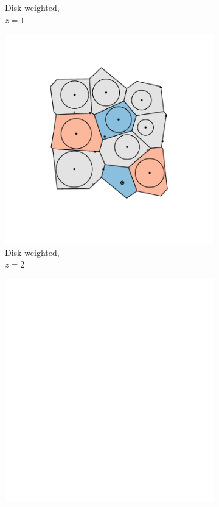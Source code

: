 \begin{figure}[tb]
\begin{subfigure}[b]{0.23\textwidth}
         \caption{Disk weighted, \\$z=1$}
         \label{fig:cut10b}
     \end{subfigure}
     \hfill
      \begin{subfigure}[b]{0.23\textwidth}
         \centering
         \includegraphics[width=\textwidth]{./figures/quasi2d/cut_z20_b.pdf}
         \caption{Disk weighted, \\$z=2$}
         \label{fig:cut20b}
     \end{subfigure}
     \hfill
     \begin{subfigure}[b]{0.23\textwidth}
         \centering
         \includegraphics[width=\textwidth]{./figures/quasi2d/empty.pdf}

\end{subfigure}
\end{figure}
